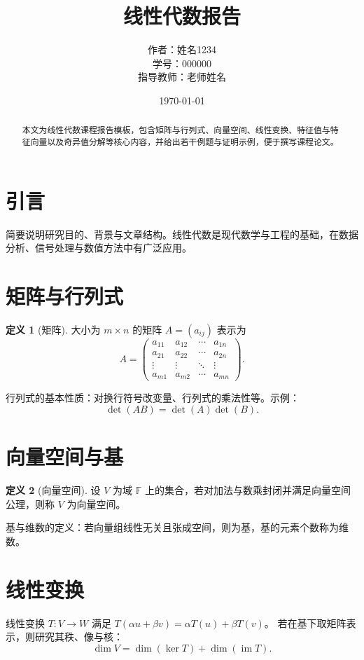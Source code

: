 \documentclass[12pt]{ctexart}
\title{线性代数报告}
\author{作者：姓名1234 \\ 学号：000000 \\ \small 指导教师：老师姓名}
\date{\today}
\theoremstyle{plain}
\theoremstyle{definition}
\newtheorem{definition}{定义}[section]
\theoremstyle{remark}
\begin{document}
\maketitle

\begin{abstract}
本文为线性代数课程报告模板，包含矩阵与行列式、向量空间、线性变换、特征值与特征向量以及奇异值分解等核心内容，并给出若干例题与证明示例，便于撰写课程论文。
\end{abstract}


\section{引言}
简要说明研究目的、背景与文章结构。线性代数是现代数学与工程的基础，在数据分析、信号处理与数值方法中有广泛应用。

\section{矩阵与行列式}
\begin{definition}[矩阵]
大小为 $m\times n$ 的矩阵 $A=(a_{ij})$ 表示为
\[
A=\begin{pmatrix}
a_{11} & a_{12} & \cdots & a_{1n} \\
a_{21} & a_{22} & \cdots & a_{2n} \\
\vdots & \vdots & \ddots & \vdots \\
a_{m1} & a_{m2} & \cdots & a_{mn}
\end{pmatrix}.
\]
\end{definition}

行列式的基本性质：对换行符号改变量、行列式的乘法性等。示例：
\[
\det(AB)=\det(A)\det(B).
\]

\section{向量空间与基}
\begin{definition}[向量空间]
设 $V$ 为域 $\mathbb{F}$ 上的集合，若对加法与数乘封闭并满足向量空间公理，则称 $V$ 为向量空间。
\end{definition}

基与维数的定义：若向量组线性无关且张成空间，则为基，基的元素个数称为维数。

\section{线性变换}
线性变换 $T: V\to W$ 满足 $T(\alpha u+\beta v)=\alpha T(u)+\beta T(v)$。
若在基下取矩阵表示，则研究其秩、像与核：
\[
\dim V = \dim(\ker T) + \dim(\operatorname{im} T).
\]
\end{document}
